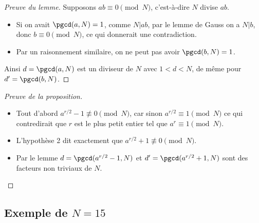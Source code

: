\documentclass[11pt,class=report,crop=false]{standalone}
\begin{document}
\begin{proof}[Preuve du lemme]
Supposons $ab \equiv 0 \pmod N$, c'est-à-dire $N$ divise $ab$.
\begin{itemize}
	\item Si on avait $\pgcd(a,N) = 1$, comme $N|ab$, par le lemme de Gauss on a $N|b$, donc $b\equiv 0 \pmod N$, ce qui donnerait une contradiction.
	\item Par un raisonnement similaire, on ne peut pas avoir $\pgcd(b,N)=1$.
\end{itemize}
Ainsi $d=\pgcd(a,N)$ est un diviseur de $N$ avec $1<d<N$, de même pour $d'=\pgcd(b,N)$.
\end{proof}

\begin{proof}[Preuve de la proposition]
~
\begin{itemize}	
	\item Tout d'abord $a^{r/2}-1 \not\equiv 0 \pmod N$, car sinon $a^{r/2} \equiv 1 \pmod N$ ce qui contredirait que $r$ est le plus petit entier tel que $a^r \equiv 1 \pmod N$.
	\item L'hypothèse 2 dit exactement que $a^{r/2}+1 \not\equiv 0 \pmod N$.
	\item Par le lemme $d = \pgcd(a^{r/2}-1,N)$ et $d' = \pgcd(a^{r/2}+1,N)$ sont des facteurs non triviaux de $N$.
\end{itemize}
\end{proof}

\subsection{Exemple de $N=15$}
\end{document}
